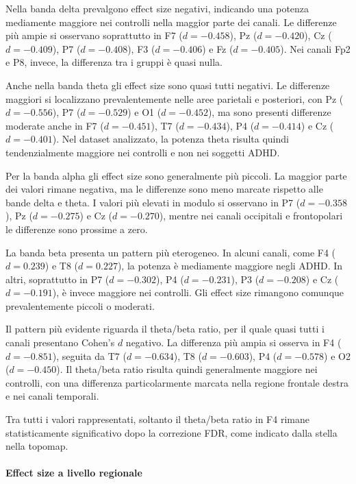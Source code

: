 Nella banda delta prevalgono effect size negativi, indicando una
potenza mediamente maggiore nei controlli nella maggior parte dei
canali. Le differenze più ampie si osservano soprattutto in F7
($d=-0.458$), Pz ($d=-0.420$), Cz ($d=-0.409$), P7
($d=-0.408$), F3 ($d=-0.406$) e Fz ($d=-0.405$). Nei canali Fp2
e P8, invece, la differenza tra i gruppi è quasi nulla.

Anche nella banda theta gli effect size sono quasi tutti negativi.
Le differenze maggiori si localizzano prevalentemente nelle aree
parietali e posteriori, con Pz ($d=-0.556$), P7 ($d=-0.529$) e
O1 ($d=-0.452$), ma sono presenti differenze moderate anche in F7
($d=-0.451$), T7 ($d=-0.434$), P4 ($d=-0.414$) e Cz
($d=-0.401$). Nel dataset analizzato, la potenza theta risulta quindi
tendenzialmente maggiore nei controlli e non nei soggetti ADHD.

Per la banda alpha gli effect size sono generalmente più piccoli.
La maggior parte dei valori rimane negativa, ma le differenze sono
meno marcate rispetto alle bande delta e theta. I valori più elevati
in modulo si osservano in P7 ($d=-0.358$), Pz ($d=-0.275$) e Cz
($d=-0.270$), mentre nei canali occipitali e frontopolari le
differenze sono prossime a zero.

La banda beta presenta un pattern più eterogeneo. In alcuni canali,
come F4 ($d=0.239$) e T8 ($d=0.227$), la potenza è mediamente
maggiore negli ADHD. In altri, soprattutto in P7 ($d=-0.302$), P4
($d=-0.231$), P3 ($d=-0.208$) e Cz ($d=-0.191$), è invece
maggiore nei controlli. Gli effect size rimangono comunque
prevalentemente piccoli o moderati.

Il pattern più evidente riguarda il theta/beta ratio, per il quale
quasi tutti i canali presentano Cohen's $d$ negativo. La differenza
più ampia si osserva in F4 ($d=-0.851$), seguita da T7
($d=-0.634$), T8 ($d=-0.603$), P4 ($d=-0.578$) e O2
($d=-0.450$). Il theta/beta ratio risulta quindi generalmente
maggiore nei controlli, con una differenza particolarmente marcata
nella regione frontale destra e nei canali temporali.

Tra tutti i valori rappresentati, soltanto il theta/beta ratio in F4
rimane statisticamente significativo dopo la correzione FDR, come
indicato dalla stella nella topomap.


\paragraph{Effect size a livello regionale}

